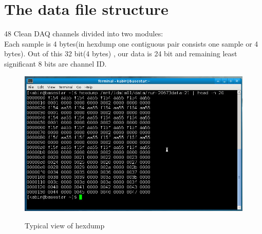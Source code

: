 \documentclass[12pt]{article}
\begin{document}
\newpage
\section{The data file structure}
48 Clean DAQ channels divided into two modules: \\
Each sample is 4 bytes(in hexdump one contiguous pair consists one sample or 4 bytes). Out of this 32 bit(4 bytes) , our data is 24 bit and remaining least significant 8 bits are channel ID. \\
\begin{figure}[htb]
\centering
\includegraphics[width=6in]{hexdump.png}\\
\caption{Typical view of hexdump}\label{f1}
\end{figure}
\end{document}
